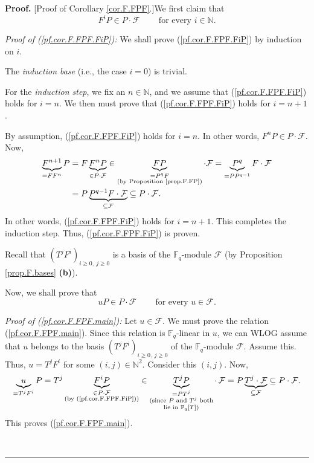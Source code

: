 \documentclass[numbers=enddot,12pt,final,onecolumn,notitlepage]{scrartcl}%
\theoremstyle{definition}
\newenvironment{proof}[1][Proof]{\noindent\textbf{#1.} }{\ \rule{0.5em}{0.5em}}
\begin{document}
\begin{proof}
[Proof of Corollary \ref{cor.F.FPF}.]We first claim that%
\begin{equation}
F^{i}P\in P\cdot\mathcal{F}\ \ \ \ \ \ \ \ \ \ \text{for every }i\in
\mathbb{N}. \label{pf.cor.F.FPF.FiP}%
\end{equation}


\textit{Proof of (\ref{pf.cor.F.FPF.FiP}):} We shall prove
(\ref{pf.cor.F.FPF.FiP}) by induction on $i$.

The \textit{induction base} (i.e., the case $i=0$) is trivial.

For the \textit{induction step}, we fix an $n\in\mathbb{N}$, and we assume
that (\ref{pf.cor.F.FPF.FiP}) holds for $i=n$. We then must prove that
(\ref{pf.cor.F.FPF.FiP}) holds for $i=n+1$.

By assumption, (\ref{pf.cor.F.FPF.FiP}) holds for $i=n$. In other words,
$F^{n}P\in P\cdot\mathcal{F}$. Now,%
\begin{align*}
\underbrace{F^{n+1}}_{=FF^{n}}P  &  =F\underbrace{F^{n}P}_{\in P\cdot
\mathcal{F}}\in\underbrace{FP}_{\substack{=P^{q}F\\\text{(by Proposition
\ref{prop.F.FP})}}}\cdot\mathcal{F}=\underbrace{P^{q}}_{=PP^{q-1}}%
F\cdot\mathcal{F}\\
&  =P\underbrace{P^{q-1}F\cdot\mathcal{F}}_{\subseteq\mathcal{F}}\subseteq
P\cdot\mathcal{F}.
\end{align*}
In other words, (\ref{pf.cor.F.FPF.FiP}) holds for $i=n+1$. This completes the
induction step. Thus, (\ref{pf.cor.F.FPF.FiP}) is proven.

Recall that $\left(  T^{j}F^{i}\right)  _{i\geq0,\ j\geq0}$ is a basis of the
$\mathbb{F}_{q}$-module $\mathcal{F}$ (by Proposition \ref{prop.F.bases}
\textbf{(b)}).

Now, we shall prove that%
\begin{equation}
uP\in P\cdot\mathcal{F}\ \ \ \ \ \ \ \ \ \ \text{for every }u\in\mathcal{F}.
\label{pf.cor.F.FPF.main}%
\end{equation}


\textit{Proof of (\ref{pf.cor.F.FPF.main}):} Let $u\in\mathcal{F}$. We must
prove the relation (\ref{pf.cor.F.FPF.main}). Since this relation is
$\mathbb{F}_{q}$-linear in $u$, we can WLOG assume that $u$ belongs to the
basis $\left(  T^{j}F^{i}\right)  _{i\geq0,\ j\geq0}$ of the $\mathbb{F}_{q}%
$-module $\mathcal{F}$. Assume this. Thus, $u=T^{j}F^{i}$ for some $\left(
i,j\right)  \in\mathbb{N}^{2}$. Consider this $\left(  i,j\right)  $. Now,%
\[
\underbrace{u}_{=T^{j}F^{i}}P=T^{j}\underbrace{F^{i}P}_{\substack{\in
P\cdot\mathcal{F}\\\text{(by (\ref{pf.cor.F.FPF.FiP}))}}}\in\underbrace{T^{j}%
P}_{\substack{=PT^{j}\\\text{(since }P\text{ and }T^{j}\text{ both}\\\text{lie
in }\mathbb{F}_{q}\left[  T\right]  \text{)}}}\cdot\,\mathcal{F}%
=P\underbrace{T^{j}\cdot\mathcal{F}}_{\subseteq\mathcal{F}}\subseteq
P\cdot\mathcal{F}.
\]
This proves (\ref{pf.cor.F.FPF.main}).


\end{proof}
\end{document}
